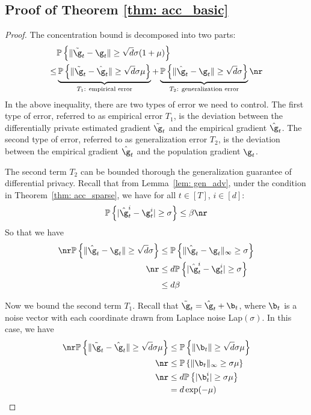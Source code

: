 \subsection{Proof of Theorem \ref{thm: acc_basic}}

\theoaccbasic*

\begin{proof}
The concentration bound is decomposed into two parts:
\begin{equation}
    \begin{split}
    &\mathbb{P} 
    \left\{ \|\tilde \g_t - \g_t\| \geq \sqrt{d}\sigma(1+\mu)\right\} \\
    \leq&   
    \underbrace{ \mathbb{P}\left\{ \|\tilde \g_t - \hat \g_t\| \geq  \sqrt{d}\sigma \mu\right\} }_{\text{$T_1$: empirical error}} 
     + \underbrace{\mathbb{P}\left\{ \|\hat \g_t - \g_t\| \geq \sqrt{d}\sigma \right\}}_{\text{$T_2$: generalization error}} \nr
    \end{split}
\end{equation}
In the above inequality, there are two types of error we need to control. The first type of error, referred to as empirical error $T_1$, is the deviation between the differentially
private estimated gradient $\tilde \g_t$ and the empirical gradient $\hat \g_t$. The second type of error, referred to as generalization error $T_2$, is the deviation
between the empirical gradient $\hat \g_t$ and the population gradient $\g_t$. 

The second term $T_2$ can be bounded thorough the generalization guarantee of differential privacy. Recall that from  Lemma~\ref{lem: gen_adv}, under the condition in Theorem~\ref{thm: acc_sparse}, we have for all $t \in [T]$, $i \in [d]$: 
\begin{equation}
    \mathbb{P}\left\{ |\hat \g_t^i - \g_t^i| \geq  \sigma \right\} \leq \beta \nr
\end{equation}
So that we have 
\begin{align} \label{eq: gen1}
   \nr \mathbb{P}\left\{ \|\hat \g_t - \g_t\| \geq  \sqrt{d}\sigma \right\} &\leq \mathbb{P}\left\{ \|\hat \g_t - \g_t\|_\infty \geq  \sigma  \right\} \\ \nr &\leq d \mathbb{P}\left\{ |\hat \g_t^i - \g_t^i| \geq  \sigma \right\} \\ &\leq
    d\beta 
\end{align}

Now we bound the second term $T_1$. Recall that $\tilde \g_t = \hat \g_t + \b_t$, where $\b_t$ is a noise vector with each coordinate drawn from Laplace noise Lap$(\sigma)$. In this case, we have
\begin{align} \label{eq: acc1}
    \nr \mathbb{P}\left\{ \|\tilde \g_t - \hat \g_t\| \geq  \sqrt{d}\sigma \mu \right\} 
    &\leq \mathbb{P} \left\{ \|\b_t\| \geq  \sqrt{d}\sigma \mu \right\} \\ 
  \nr  &\leq \mathbb{P} \left\{ \|\b_t\|_\infty \geq  \sigma \mu \right\} \\ 
  \nr  &\leq d \mathbb{P} \left\{ |\b_t^i| \geq \sigma \mu \right\}\\
    &= d \exp(-\mu)
\end{align}


\end{proof}
